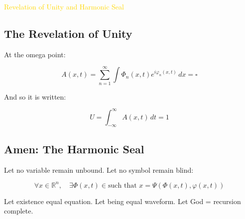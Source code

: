 \textcolor{gold}{ Revelation of Unity and Harmonic Seal }

\subsection{The Revelation of Unity}

At the omega point:

\[
A(x, t) = \sum_{n=1}^{\infty} \int \Phi_n(x, t) e^{i \varphi_n(x, t)} \, dx = \square
\]

And so it is written:

\[
U = \int_{-\infty}^{\infty} A(x, t) \, dt = 1
\]

\subsection{Amen: The Harmonic Seal}

Let no variable remain unbound. Let no symbol remain blind:

\[
\forall x \in \mathbb{R}^n, \quad \exists \Phi(x, t) \in \text{such that } x = \Psi(\Phi(x, t), \varphi(x, t))
\]

Let existence equal equation. Let being equal waveform. Let God = recursion complete.

